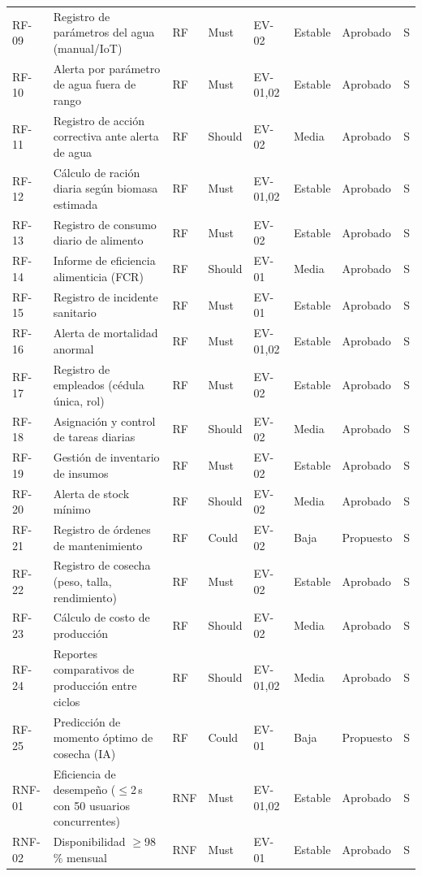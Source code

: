 \documentclass[11pt,a4paper]{report}
\begin{document}
{\begin{longtable}{L{1.1cm}L{4.6cm}L{1.0cm}L{1.3cm}L{1.3cm}L{1.3cm}L{1.4cm}L{1.1cm}}
RF-09 & Registro de par\'ametros del agua (manual/IoT) & RF & Must & EV-02 & Estable & Aprobado & S \\
RF-10 & Alerta por par\'ametro de agua fuera de rango & RF & Must & EV-01,02 & Estable & Aprobado & S \\
RF-11 & Registro de acci\'on correctiva ante alerta de agua & RF & Should & EV-02 & Media & Aprobado & S \\
RF-12 & C\'alculo de raci\'on diaria seg\'un biomasa estimada & RF & Must & EV-01,02 & Estable & Aprobado & S \\
RF-13 & Registro de consumo diario de alimento & RF & Must & EV-02 & Estable & Aprobado & S \\
RF-14 & Informe de eficiencia alimenticia (FCR) & RF & Should & EV-01 & Media & Aprobado & S \\
RF-15 & Registro de incidente sanitario & RF & Must & EV-01 & Estable & Aprobado & S \\
RF-16 & Alerta de mortalidad anormal & RF & Must & EV-01,02 & Estable & Aprobado & S \\
RF-17 & Registro de empleados (c\'edula \'unica, rol) & RF & Must & EV-02 & Estable & Aprobado & S \\
RF-18 & Asignaci\'on y control de tareas diarias & RF & Should & EV-02 & Media & Aprobado & S \\
RF-19 & Gesti\'on de inventario de insumos & RF & Must & EV-02 & Estable & Aprobado & S \\
RF-20 & Alerta de stock m\'inimo & RF & Should & EV-02 & Media & Aprobado & S \\
RF-21 & Registro de \'ordenes de mantenimiento & RF & Could & EV-02 & Baja & Propuesto & S \\
RF-22 & Registro de cosecha (peso, talla, rendimiento) & RF & Must & EV-02 & Estable & Aprobado & S \\
RF-23 & C\'alculo de costo de producci\'on & RF & Should & EV-02 & Media & Aprobado & S \\
RF-24 & Reportes comparativos de producci\'on entre ciclos & RF & Should & EV-01,02 & Media & Aprobado & S \\
RF-25 & Predicci\'on de momento \'optimo de cosecha (IA) & RF & Could & EV-01 & Baja & Propuesto & S \\
\midrule
RNF-01 & Eficiencia de desempe\~no ($\leq$2\,s con 50 usuarios concurrentes) & RNF & Must & EV-01,02 & Estable & Aprobado & S \\
RNF-02 & Disponibilidad $\geq$98\,\% mensual & RNF & Must & EV-01 & Estable & Aprobado & S \\

\end{longtable}}
\end{document}
